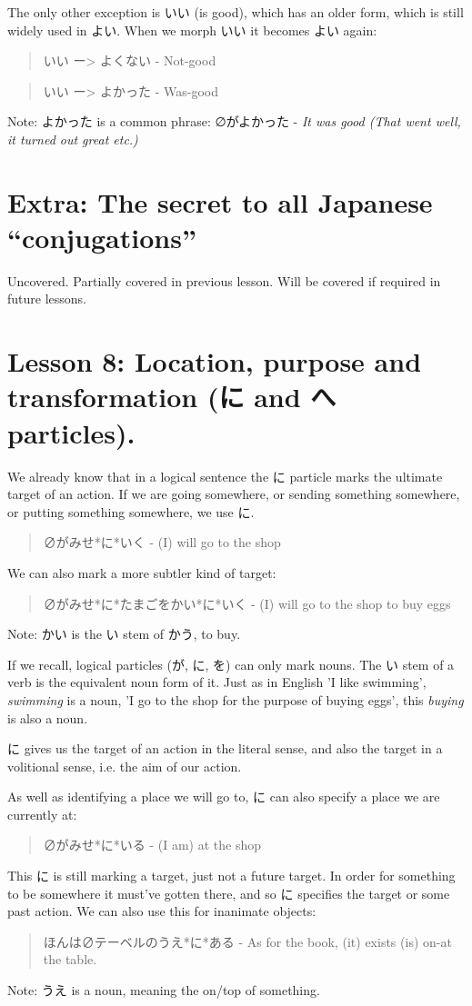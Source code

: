 \documentclass[11pt]{article}
\begin{document}
The only other exception is いい (is good), which has an older form, which is still widely used in よい. When we morph いい it becomes よい again:
\begin{quote}
いい ー> よくない - Not-good
\end{quote}
\begin{quote}
いい ー> よかった - Was-good
\end{quote}

Note: よかった is a common phrase: ∅がよかった - \emph{It was good (That went well, it turned out great etc.)}
\section{Extra: The secret to all Japanese ``conjugations''}
\label{sec:org51d70bc}
Uncovered. Partially covered in previous lesson. Will be covered if required in future lessons.
\section{Lesson 8: Location, purpose and transformation (に and へ particles).}
\label{sec:orgda65fcf}
We already know that in a logical sentence the に particle marks the ultimate target of an action. If we are going somewhere, or sending something somewhere, or putting something somewhere, we use に.
\begin{quote}
∅がみせ*に*いく - (I) will go to the shop
\end{quote}
We can also mark a more subtler kind of target:
\begin{quote}
∅がみせ*に*たまごをかい*に*いく - (I) will go to the shop to buy eggs
\end{quote}
Note: かい is the い stem of かう, to buy.

If we recall, logical particles (が, に, を) can only mark nouns. The い stem of a verb is the equivalent noun form of it. Just as in English 'I like swimming', \emph{swimming} is a noun, 'I go to the shop for the purpose of buying eggs', this \emph{buying} is also a noun.

に gives us the target of an action in the literal sense, and also the target in a volitional sense, i.e. the aim of our action.

As well as identifying a place we will go to, に can also specify a place we are currently at:
\begin{quote}
∅がみせ*に*いる - (I am) at the shop
\end{quote}
This に is still marking a target, just not a future target. In order for something to be somewhere it must've gotten there, and so に specifies the target or some past action. We can also use this for inanimate objects:
\begin{quote}
ほんは∅テーベルのうえ*に*ある - As for the book, (it) exists (is) on-at the table.
\end{quote}
Note: うえ is a noun, meaning the on/top of something.
\end{document}
